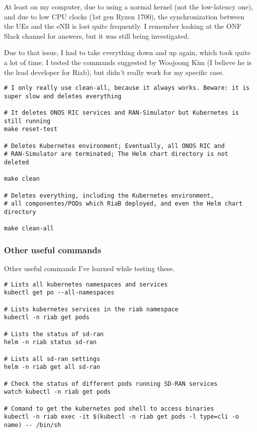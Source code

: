 \documentclass{article}
\begin{document}
            At least on my computer, due to using a normal kernel (not the low-latency one),
            and due to low CPU clocks (1st gen Ryzen 1700), the synchronization between the
            UEs and the eNB is lost quite frequently. I remember looking at the ONF Slack
            channel for answers, but it was still being investigated.

            Due to that issue, I had to take everything down and up again, which took quite
            a lot of time. I tested the commands suggested by Woojoong Kim (I believe he is
            the lead developer for Riab), but didn't really work for my specific case.

\begin{verbatim}
# I only really use clean-all, because it always works. Beware: it is super slow and deletes everything

# It deletes ONOS RIC services and RAN-Simulator but Kubernetes is still running
make reset-test

# Deletes Kubernetes environment; Eventually, all ONOS RIC and
# RAN-Simulator are terminated; The Helm chart directory is not deleted

make clean

# Deletes everything, including the Kubernetes environment,
# all componentes/PODs which RiaB deployed, and even the Helm chart directory

make clean-all
\end{verbatim}

        \subsubsection{Other useful commands}
            Other useful commands I've learned while testing these.

\begin{verbatim}
# Lists all kubernetes namespaces and services
kubectl get po --all-namespaces

# Lists kubernetes services in the riab namespace
kubectl -n riab get pods

# Lists the status of sd-ran
helm -n riab status sd-ran

# Lists all sd-ran settings
helm -n riab get all sd-ran

# Check the status of different pods running SD-RAN services
watch kubectl -n riab get pods

# Comand to get the kubernetes pod shell to access binaries
kubectl -n riab exec -it $(kubectl -n riab get pods -l type=cli -o name) -- /bin/sh
\end{verbatim}
\end{document}
